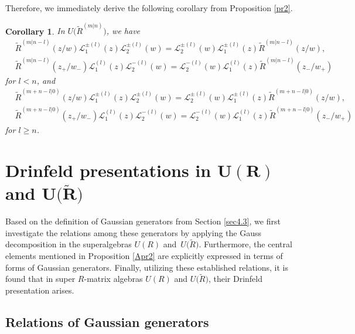 \documentclass[pdftex]{sigma}
\numberwithin{equation}{section}
\newtheorem{Corollary}[Theorem]{Corollary}
\begin{document}
Therefore, we immediately derive the following corollary from Proposition \ref{pr2}.
\begin{Corollary}\label{co2}In $U\bigl(\widetilde{R}^{(m|n)}\bigr)$, we have
\begin{align*}
 &\widetilde{R}^{(m|n-l)}(z/w)\mathcal{L}_1^{\pm(l)}(z)\mathcal{L}_2^{\pm(l)}(w)=\mathcal{L}_2^{\pm(l)}(w)\mathcal{L}_1^{\pm(l)}(z) \widetilde{R}^{(m|n-l)}(z/w),\\
&\widetilde{R}^{(m|n-l)}(z_+/w_-)\mathcal{L}_1^{(l)}(z)\mathcal{L}_2^{-(l)}(w)=\mathcal{L}_2^{-(l)}(w)\mathcal{L}_1^{(l)}(z) \widetilde{R}^{(m|n-l)}(z_-/w_+)
\end{align*}for $l< n$, and
\begin{align*}
 &\widetilde{R}^{(m+n-l|0)}(z/w)\mathcal{L}_1^{\pm(l)}(z)\mathcal{L}_2^{\pm(l)}(w)=\mathcal{L}_2^{\pm(l)}(w)\mathcal{L}_1^{\pm(l)}(z) \widetilde{R}^{(m+n-l|0)}(z/w),\\
&\widetilde{R}^{(m+n-l|0)}(z_+/w_-)\mathcal{L}_1^{(l)}(z)\mathcal{L}_2^{-(l)}(w)=\mathcal{L}_2^{-(l)}(w)\mathcal{L}_1^{(l)}(z) \widetilde{R}^{(m+n-l|0)}(z_-/w_+)
\end{align*}for $l\geq n$.
\end{Corollary}

\section[Drinfeld presentations in U(R) and U(R)]{Drinfeld presentations in $\boldsymbol{U(R)}$ and $\boldsymbol{U\bigl(\widetilde{R}\bigr)}$ }\label{sec5}



Based on the definition of Gaussian generators from Section \ref{sec4.3},
 we first investigate the relations among these generators by applying the Gauss decomposition in the superalgebras $U(R)$ and~$U\bigl(\widetilde{R}\bigr)$.
Furthermore, the central elements mentioned in Proposition \ref{Apr2} are explicitly expressed in terms of forms of Gaussian generators. Finally,
utilizing these established relations, it is found that in super $R$-matrix algebras $U(R)$ and $U\bigl(\widetilde{R}\bigr)$, their Drinfeld presentation arises.



\subsection{Relations of Gaussian generators}
\end{document}
